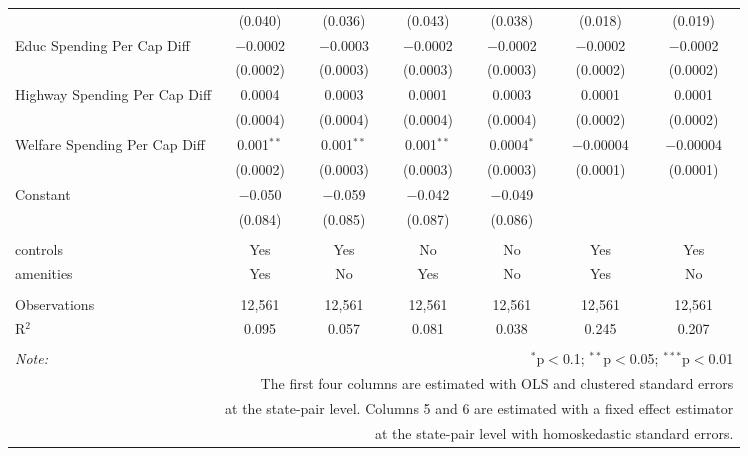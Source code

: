 \begin{table}[!htbp]
\begin{tabular}{@{\extracolsep{5pt}}lcccccc}
  & (0.040) & (0.036) & (0.043) & (0.038) & (0.018) & (0.019) \\ 
  Educ Spending Per Cap Diff & $-$0.0002 & $-$0.0003 & $-$0.0002 & $-$0.0002 & $-$0.0002 & $-$0.0002 \\ 
  & (0.0002) & (0.0003) & (0.0003) & (0.0003) & (0.0002) & (0.0002) \\ 
  Highway Spending Per Cap Diff & 0.0004 & 0.0003 & 0.0001 & 0.0003 & 0.0001 & 0.0001 \\ 
  & (0.0004) & (0.0004) & (0.0004) & (0.0004) & (0.0002) & (0.0002) \\ 
  Welfare Spending Per Cap Diff & 0.001$^{**}$ & 0.001$^{**}$ & 0.001$^{**}$ & 0.0004$^{*}$ & $-$0.00004 & $-$0.00004 \\ 
  & (0.0002) & (0.0003) & (0.0003) & (0.0003) & (0.0001) & (0.0001) \\ 
  Constant & $-$0.050 & $-$0.059 & $-$0.042 & $-$0.049 &  &  \\ 
  & (0.084) & (0.085) & (0.087) & (0.086) &  &  \\ 
 \hline \\[-1.8ex] 
controls & Yes & Yes & No & No & Yes & Yes \\ 
amenities & Yes & No & Yes & No & Yes & No \\ 
\hline \\[-1.8ex] 
Observations & 12,561 & 12,561 & 12,561 & 12,561 & 12,561 & 12,561 \\ 
R$^{2}$ & 0.095 & 0.057 & 0.081 & 0.038 & 0.245 & 0.207 \\ 
\hline 
\hline \\[-1.8ex] 
\textit{Note:}  & \multicolumn{6}{r}{$^{*}$p$<$0.1; $^{**}$p$<$0.05; $^{***}$p$<$0.01} \\ 
 & \multicolumn{6}{r}{The first four columns are estimated with OLS and clustered standard errors} \\ 
 & \multicolumn{6}{r}{at the state-pair level. Columns 5 and 6 are estimated with a fixed effect estimator} \\ 
 & \multicolumn{6}{r}{at the state-pair level with homoskedastic standard errors.} \\ 
\end{tabular} 
\end{table} 
